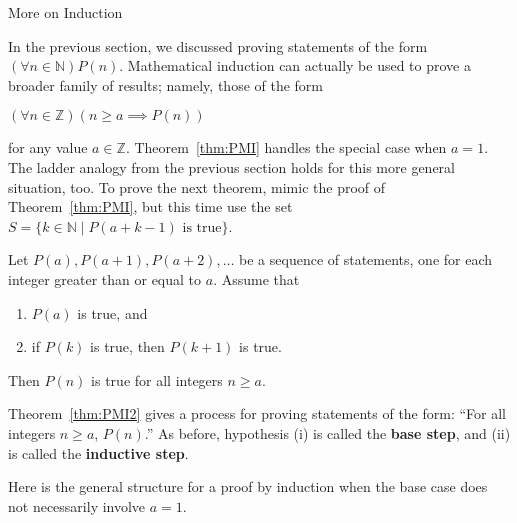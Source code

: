 \begin{section}{More on Induction}

In the previous section, we discussed proving statements of the form $(\forall n \in \mathbb{N}) P(n)$. Mathematical induction can actually be used to prove a broader family of results; namely, those of the form
\begin{center}
$(\forall n \in \mathbb{Z})(n \geq a \implies P(n))$
\end{center}
for any value $a \in \mathbb{Z}$. Theorem~\ref{thm:PMI} handles the special case when $a = 1$.  The ladder analogy from the previous section holds for this more general situation, too. To prove the next theorem, mimic the proof of Theorem~\ref{thm:PMI}, but this time use the set $S=\{k\in \mathbb{N}\mid P(a+k-1) \text{ is true}\}$.

\begin{theorem}\label{thm:PMI2}
Let $P(a), P(a+1), P(a+2), \ldots$ be a sequence of statements, one for each integer greater than or equal to $a$. Assume that
\begin{enumerate}[label=\textrm{(\roman*)}]
\item $P(a)$ is true, and
\item if $P(k)$ is true, then $P(k+1)$ is true.
\end{enumerate}
Then $P(n)$ is true for all integers $n \geq a$.
\end{theorem}

Theorem~\ref{thm:PMI2} gives a process for proving statements of the form: ``For all integers $n\geq a$, $P(n)$.'' As before, hypothesis (i) is called the \textbf{base step}, and (ii) is called the \textbf{inductive step}.

\begin{skeleton}
Here is the general structure for a proof by induction when the base case does not necessarily involve $a=1$.

\begin{center}
\end{center}
\end{skeleton}
\end{section}
